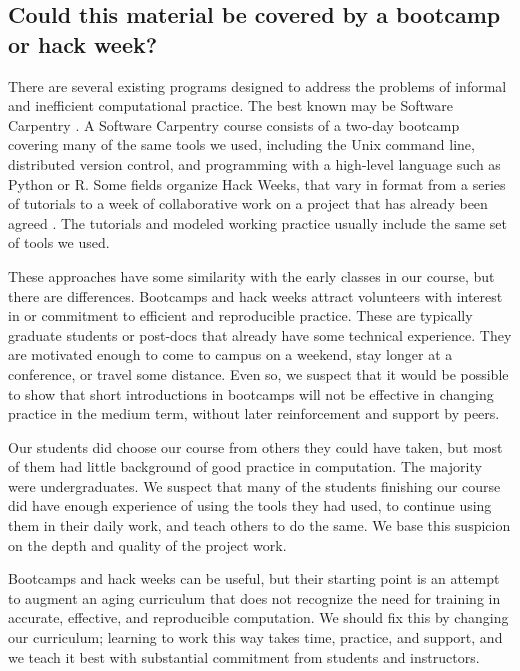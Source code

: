 \subsection{Could this material be covered by a bootcamp or hack week?}

There are several existing programs designed to address the problems
of informal and inefficient computational practice.  The best known may be
Software Carpentry \citep{wilson2014software}.  A Software Carpentry course
consists of a two-day bootcamp covering many of the same tools we used,
including the Unix command line, distributed version control, and programming
with a high-level language such as Python or R. Some fields organize Hack
Weeks, that vary in format from a series of tutorials to a week of
collaborative work on a project that has already been agreed
\citep{huppenkothen_hack_2017}.  The tutorials and modeled working practice
usually include the same set of tools we used.

These approaches have some similarity with the early classes in our course,
but there are differences.  Bootcamps and hack weeks attract volunteers with
interest in or commitment to efficient and reproducible practice. These are
typically graduate students or post-docs that already have some technical
experience.  They are motivated enough to come to campus on a weekend,
stay longer at a conference, or travel some distance.  Even so, we suspect
that it would be possible to show that short introductions in
bootcamps will not be effective in changing practice in the medium term,
without later reinforcement and support by peers.

Our students did choose our course from others they could have taken, but most
of them had little background of good practice in computation.  The majority
were undergraduates.  We suspect that many of the students finishing our
course did have enough experience of using the tools they had used, to
continue using them in their daily work, and teach others to do the same.  We
base this suspicion on the depth and quality of the project work.

Bootcamps and hack weeks can be useful, but their starting point is an
attempt to augment an aging curriculum that does not recognize the need for
training in accurate, effective, and reproducible computation.  We should fix
this by changing our curriculum; learning to work this way takes time,
practice, and support, and we teach it best with substantial commitment from
students and instructors.

